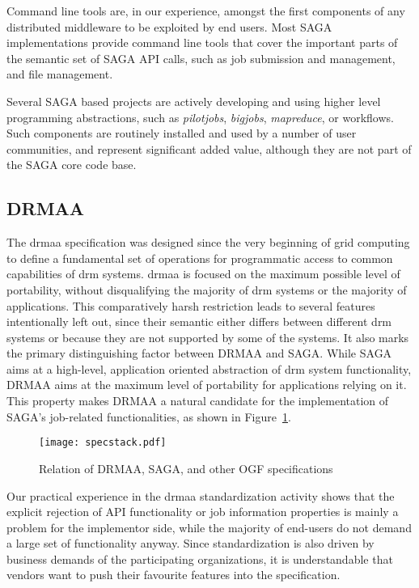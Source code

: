 \documentclass[twocolumn]{svjour3}       %
\begin{document}
Command line tools are, in our experience, amongst the first components of any distributed middleware to be exploited by end users. Most SAGA implementations provide command line tools that cover the important parts of the semantic set of SAGA API calls, such as job submission and management, and file management.

Several SAGA based projects are actively developing and using higher level programming abstractions, such as \emph{pilotjobs}, \emph{bigjobs}, \emph{mapreduce}, or workflows.  Such components are routinely installed and used by a number of user communities, and represent significant added value, although they are not part of the SAGA core code base. 

\subsection{DRMAA}
\label{sec:drmaa}

The \gls{drmaa} specification was designed since the very beginning of grid computing to define a fundamental set of operations for programmatic access to common capabilities of \gls{drm} systems. \gls{drmaa} is focused on the maximum possible level of portability, without disqualifying the majority of \gls{drm} systems or the majority of applications. This comparatively harsh restriction leads to several features intentionally left out, since their semantic either differs between different \gls{drm} systems or because they are not supported by some of the systems. It also marks the primary distinguishing factor between DRMAA and SAGA. While SAGA aims at a high-level, application oriented abstraction of \gls{drm} system functionality, DRMAA aims at the maximum level of portability for applications relying on it. This property makes DRMAA a natural candidate for the implementation of SAGA's job-related functionalities, as shown in Figure~\ref{fig:specstack}. 

\begin{figure}
  \texttt{[image: specstack.pdf]}
\caption{Relation of DRMAA, SAGA, and other OGF specifications}
\label{fig:specstack} 
\end{figure}


Our practical experience in the \gls{drmaa} standardization activity shows that the explicit rejection of API functionality or job information properties is mainly a problem for the implementor side, while the majority of end-users do not demand a large set of functionality anyway. Since standardization is also driven by business demands of the participating organizations, it is understandable that vendors want to push their favourite features into the specification.
\end{document}
